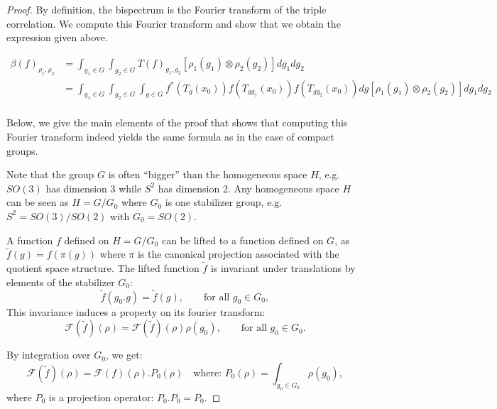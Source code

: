 \documentclass{article}
\begin{document}
\begin{proof}
By definition, the bispectrum is the Fourier transform of the triple correlation. We compute this Fourier transform and show that we obtain the expression given above.


\begin{align*}
   \beta (f)_{\rho_1, \rho_2}
   &=
   \int_{g_1 \in G} \int_{g_2 \in G}
        T(f)_{g_1, g_2}
            \left[
                \rho_1(g_1) \otimes \rho_2(g_2)
            \right]
            dg_1 dg_2 \\
   &=
    \int_{g_1 \in G} \int_{g_2 \in G}
        \int_{g \in G}
            f^*(T_g(x_0))
            f\left(T_{g g_1}(x_0)\right) f\left(T_{g g_2}(x_0)\right)
            dg
              \left[
                \rho_1(g_1) \otimes \rho_2(g_2)
              \right]
            dg_1 dg_2 \\
\end{align*}


Below, we give the main elements of the proof that shows that computing this Fourier transform indeed yields the same formula as in the case of compact groups.

Note that the group $G$ is often ``bigger'' than the homogeneous space $H$, e.g. $SO(3)$ has dimension 3 while $S^2$ has dimension 2. Any homogeneous space $H$ can be seen as $H = G / G_0$ where $G_0$ is one stabilizer group, e.g. $S^2 = SO(3) / SO(2)$ with $G_0 = SO(2)$.

A function $f$ defined on $H = G / G_0$ can be lifted to a function defined on $G$, as $\tilde{f}(g) = f(\pi(g))$ where $\pi$ is the canonical projection associated with the quotient space structure. The lifted function $\tilde{f}$ is invariant under translations by elements of the stabilizer $G_0$:
\begin{equation}
    \tilde{f}(g_0.g) = \tilde{f}(g), \qquad \text{for all $g_0 \in G_0$},
\end{equation}
This invariance induces a property on its fourier transform:
\begin{equation}
    \mathcal{F}(\tilde{f})(\rho) = \mathcal{F}(\tilde{f})(\rho) \rho(g_0), \qquad \text{for all $g_0 \in G_0$.}
\end{equation}

By integration over $G_0$, we get:
\begin{equation}
    \mathcal{F}(\tilde{f})(\rho) =  \mathcal{F}(f)(\rho).P_0(\rho)\quad \text{where: } P_0(\rho) = \int_{g_0 \in G_0} \rho(g_0),
\end{equation}
where $P_0$ is a projection operator: $P_0 . P_0 = P_0$.


\end{proof}
\end{document}
